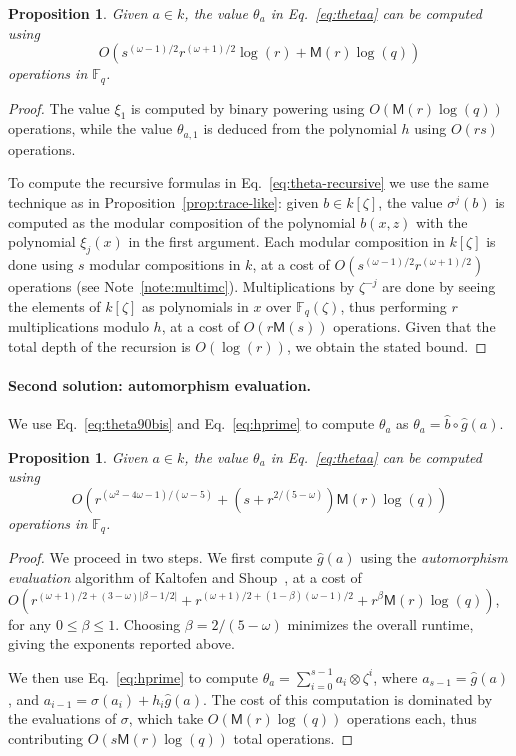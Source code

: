 \documentclass{mcom-l}
\theoremstyle{plain}
\newtheorem{proposition}[theorem]{Proposition}
\theoremstyle{definition}
\newcommand{\F}{\ensuremath{\mathbb{F}}}
\newcommand{\MM}{\ensuremath{\mathsf{M}}}
\newcounter{algorithm}
\begin{document}
\begin{proposition}
  \label{prop:xitheta}
  Given $a\in k$, the value $\theta_a$ in Eq.~\eqref{eq:thetaa} can be
  computed using \[
O(s^{(\omega-1)/2}r^{(\omega+1)/2}\log(r)+\MM(r)\log(q))
\]
  operations in $\F_q$.
\end{proposition}
\begin{proof}
  The value $\xi_1$ is computed by binary powering using
  $O(\MM(r)\log(q))$ operations, while the value $\theta_{a,1}$ is
  deduced from the polynomial $h$ using $O(rs)$ operations.
  
  To compute the recursive formulas in Eq.~\eqref{eq:theta-recursive}
  we use the same technique as in Proposition~\ref{prop:trace-like}:
  given $b \in k[\zeta]$, the value $\sigma^j(b)$ is computed as the
  modular composition of the polynomial $b(x,z)$ with the polynomial
  $\xi_j(x)$ in the first argument. %
  Each modular composition in $k[\zeta]$ is done using $s$ 
  modular compositions in $k$, at a cost of $O(s^{(\omega-1)/2}r^{(\omega+1)/2})$ operations (see Note~\ref{note:multimc}). %
  Multiplications by $\zeta^{-j}$ are done by seeing the elements of
  $k[\zeta]$ as polynomials in $x$ over $\F_q(\zeta)$, thus performing
  $r$ multiplications modulo $h$, at a cost of $O(r\MM(s))$
  operations. %
  Given that the total depth of the recursion is $O(\log(r))$, we
  obtain the stated bound.
\end{proof}

\paragraph{\bf Second solution: automorphism evaluation.}
We use Eq.~\eqref{eq:theta90bis} and Eq.~\eqref{eq:hprime}
to compute $\theta_a$ as
$\theta_a = \hat{b}\circ \hat{g} (a)$.
\begin{proposition}
  \label{prop:ks-theta}
  Given $a\in k$, the value $\theta_a$ in Eq.~\eqref{eq:thetaa} can
  be computed using
  \[
  O(r^{(\omega^2-4\omega-1)/(\omega-5)}+(s+r^{2/(5-\omega)})\MM(r)\log(q))
  \]
  operations in $\F_q$.
\end{proposition}
\begin{proof}
  We proceed in two steps. We first compute $\hat{g}(a)$ using the
  \emph{automorphism evaluation} algorithm of Kaltofen and
  Shoup~\cite[Algorithm~AE]{kaltofen+shoup98}, at a cost of
  $O(r^{(\omega+1)/2 + (3-\omega)\lvert\beta-1/2\rvert}+
  r^{(\omega+1)/2 + (1-\beta)(\omega-1)/2}+r^\beta\MM(r)\log(q))$, for
  any $0\le\beta\le1$. Choosing $\beta=2/(5-\omega)$ minimizes the
  overall runtime, giving the exponents reported above.
  
  We then use Eq.~\eqref{eq:hprime} to compute
  $\theta_a=\sum_{i=0}^{s-1}a_i\otimes\zeta^i$, where
  $a_{s-1}=\hat{g}(a)$, and $a_{i-1}=\sigma(a_i)+h_i\hat{g}(a)$. 
  The cost of this computation is dominated by the evaluations of
  $\sigma$, which take $O(\MM(r)\log(q))$ operations each, thus
  contributing $O(s\MM(r)\log(q))$ total operations.
\end{proof}
\end{document}

